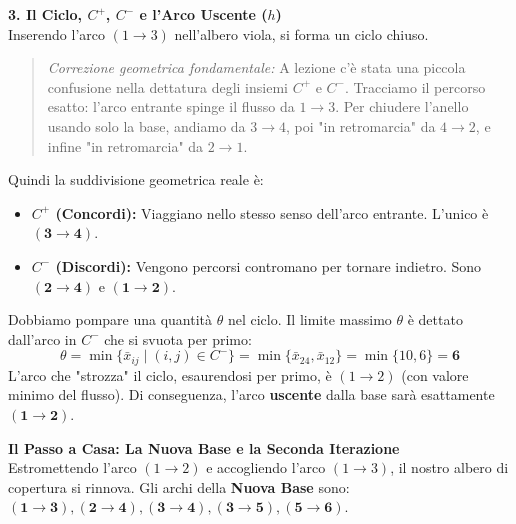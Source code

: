 \documentclass[12pt, a4paper]{article}
\newcommand{\separatore}{\noindent{\color{titlecolor!50}\rule{\textwidth}{0.6pt}}}
\begin{document}
	\vspace{0.4cm}
	\textbf{3. Il Ciclo, $C^+$, $C^-$ e l'Arco Uscente ($h$)}\\
	Inserendo l'arco $(1\to3)$ nell'albero viola, si forma un ciclo chiuso.
	\begin{quote}
		\textit{Correzione geometrica fondamentale:} A lezione c'è stata una piccola confusione nella dettatura degli insiemi $C^+$ e $C^-$. Tracciamo il percorso esatto: l'arco entrante spinge il flusso da $1 \to 3$. Per chiudere l'anello usando solo la base, andiamo da $3 \to 4$, poi "in retromarcia" da $4 \to 2$, e infine "in retromarcia" da $2 \to 1$.
	\end{quote}
	Quindi la suddivisione geometrica reale è:
	\begin{itemize}
		\item \textbf{$C^+$ (Concordi):} Viaggiano nello stesso senso dell'arco entrante. L'unico è $\mathbf{(3\to4)}$.
		\item \textbf{$C^-$ (Discordi):} Vengono percorsi contromano per tornare indietro. Sono $\mathbf{(2\to4)}$ e $\mathbf{(1\to2)}$.
	\end{itemize}
	
	Dobbiamo pompare una quantità $\theta$ nel ciclo. Il limite massimo $\theta$ è dettato dall'arco in $C^-$ che si svuota per primo:
	\[ \theta = \min \{ \bar{x}_{ij} \mid (i,j) \in C^- \} = \min \{ \bar{x}_{24}, \bar{x}_{12} \} = \min \{ 10, 6 \} = \mathbf{6} \]
	L'arco che "strozza" il ciclo, esaurendosi per primo, è $(1\to2)$ (con valore minimo del flusso). Di conseguenza, l'arco \textbf{uscente} dalla base sarà esattamente $\mathbf{(1\to2)}$.
	
	\vspace{0.6cm}
	\separatore
	\vspace{0.4cm}
	
	\textbf{Il Passo a Casa: La Nuova Base e la Seconda Iterazione}\\
	Estromettendo l'arco $(1\to2)$ e accogliendo l'arco $(1\to3)$, il nostro albero di copertura si rinnova. Gli archi della \textbf{Nuova Base} sono: $\mathbf{(1\to3), (2\to4), (3\to4), (3\to5), (5\to6)}$.
	
\end{document}

